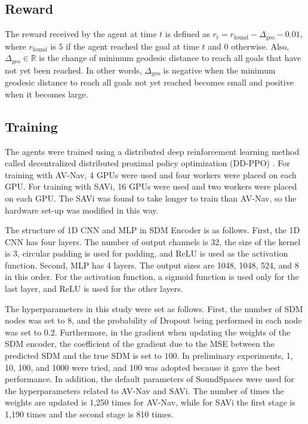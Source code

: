 \subsection{Reward}

The reward received by the agent at time $t$ is defined as
$
r_t = r_{\mathrm{found}} - \Delta_{\mathrm{geo}} - 0.01, \label{eq:reward_definition}
$
where $r_{\mathrm{found}}$ is $5$ if the agent reached the goal at time $t$ and $0$ otherwise.
Also, $\Delta_{\mathrm{geo}} \in \mathbb{R}$ is the  change of minimum geodesic distance to reach all goals that have not yet been reached.
In other words, $\Delta_{\mathrm{geo}}$ is negative when the minimum geodesic distance to reach all goals not yet reached becomes small and positive when it becomes large.



\subsection{Training}

The agents were trained using a distributed deep reinforcement learning method called decentralized distributed proximal policy optimization (DD-PPO) \cite{wijmans2019dd}.
For training with AV-Nav, 4 GPUs were used and four workers were placed on each GPU.
For training with SAVi, 16 GPUs were used and two workers were placed on each GPU.
The SAVi was found to take longer to train than AV-Nav, so the hardware set-up was modified in this way.

The structure of 1D CNN and MLP in SDM Encoder is as follows.
First, the 1D CNN has four layers.
The number of output channels is 32, the size of the kernel is 3, circular padding is used for padding, and ReLU is used as the activation function.
Second, MLP has 4 layers.
The output sizes are 1048, 1048, 524, and 8 in this order.
For the activation function, a sigmoid function is used only for the last layer, and ReLU is used for the other layers.

The hyperparameters in this study were set as follows.
First, the number of SDM nodes was set to $8$, and the probability of Dropout being performed in each node was set to $0.2$.
Furthermore, in the gradient when updating the weights of the SDM encoder, the coefficient of the gradient due to the MSE between the predicted SDM and the true SDM is set to $100$.
In preliminary experiments, 1, 10, 100, and 1000 were tried, and 100 was adopted because it gave the best performance.
In addition, the default parameters of SoundSpaces were used for the hyperparameters related to AV-Nav and SAVi.
The number of times the weights are updated is 1,250 times for AV-Nav, while for SAVi the first stage is 1,190 times and the second stage is 810 times.



